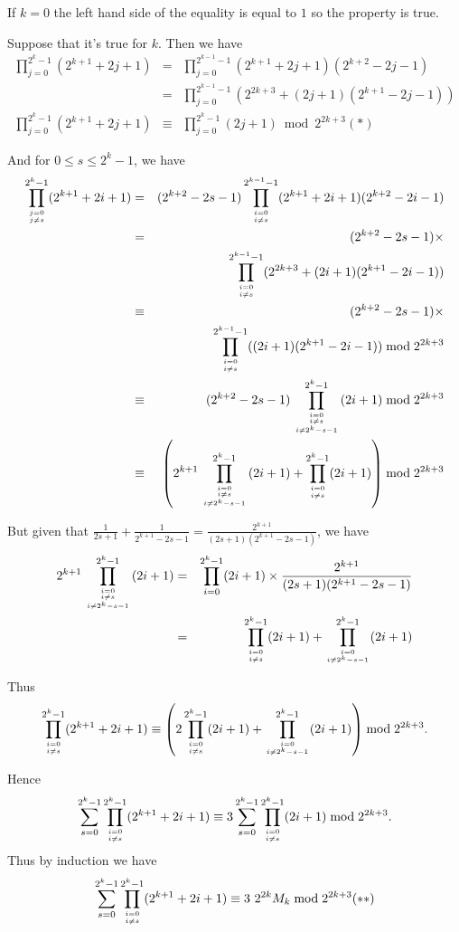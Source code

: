 \documentclass[a4paper,12pt]{article}
\begin{document}
If $k=0$ the left hand side of the equality is equal to $1$ so the
property is true.

Suppose that it's true for $k$.  Then we have
\begin{eqnarray*}
  \prod_{j=0}^{2^k-1}(2^{k+1} + 2j + 1) &=& \prod_{j=0}^{2^{k-1}-1}(2^{k+1}
  + 2j + 1)(2^{k+2} - 2j - 1) \\
  &=& \prod_{j=0}^{2^{k-1}-1}(2^{2k+3} + (2j+1)(2^{k+1}-2j-1)) \\
  \prod_{j=0}^{2^k-1}(2^{k+1} + 2j + 1) &\equiv&
  \prod_{j=0}^{2^k-1}(2j+1) \bmod 2^{2k+3} (*)
\end{eqnarray*}

And for $0 \le s \le 2^k -1$, we have
\begin{eqnarray*}
  \prod_{j=0 \atop j\not= s}^{2^k-1} (2^{k+1} + 2i + 1) &=& (2^{k+2} -
  2s -1) \prod_{i=0 \atop i \not= s}^{2^{k-1}-1}(2^{k+1} + 2i +
  1)(2^{k+2} - 2i - 1) \\
  &=& (2^{k+2} - 2s - 1) \times \\
  &&\prod_{i=0\atop i\not=s}^{2^{k-1}-1}(2^{2k+3}
  + (2i+1)(2^{k+1}-2i-1)) \\
  &\equiv& (2^{k+2} - 2s - 1) \times \\
  &&\prod_{i=0\atop i\not=s}^{2^{k-1}-1}((2i+1)(2^{k+1}-2i-1)) \bmod
  2^{2k+3}\\
  &\equiv& (2^{k+2} - 2s -1) \prod_{i=0\atop {i \not= s \atop i \not=
      2^k - s -1}}^{2^k-1} (2i+1) \bmod 2^{2k+3} \\
  &\equiv& \left(2^{k+1}\prod_{i=0\atop {i \not= s \atop i \not=
      2^k - s -1}}^{2^k-1} (2i+1) + \prod_{i=0\atop i\not=
    s}^{2^k-1}(2i+1)\right) \bmod 2^{2k+3}
\end{eqnarray*}

But given that $\frac{1}{2s+1} + \frac{1}{2^{k+1} - 2s - 1} =
\frac{2^{k+1}}{(2s+1)(2^{k+1}-2s-1)}$, we have
\begin{eqnarray*}
2^{k+1}\prod_{i=0\atop {i \not= s \atop i \not=
      2^k - s -1}}^{2^k-1} (2i+1) &=& \prod_{i=0}^{2^k-1}(2i+1)\times
\frac{2^{k+1}}{(2s+1)(2^{k+1}-2s-1)} \\
&=& \prod_{i=0\atop i\not= s}^{2^k-1}(2i+1) + \prod_{i=0\atop i\not= 2^k-s-1}^{2^k-1}(2i+1)
\end{eqnarray*}

Thus
\[  \prod_{i=0\atop i\not= s}^{2^k - 1}(2^{k+1} + 2i + 1) \equiv \left(2
\prod_{i=0\atop i\not= s}^{2^k-1}(2i+1) + \prod_{i=0\atop i\not= 2^k
  -s -1}^{2^k-1}(2i+1)\right) \bmod 2^{2k+3}.\]

Hence
\[\sum_{s=0}^{2^k-1}\prod_{i=0\atop i\not=s}^{2^k-1}(2^{k+1} + 2i +
1) \equiv 3 \sum_{s=0}^{2^k-1}\prod_{i=0\atop i\not=s}^{2^k-1}(2i+1)
\bmod 2^{2k+3}.\]
Thus by induction we have
\[\sum_{s=0}^{2^k-1}\prod_{i=0\atop i\not=s}^{2^k-1}(2^{k+1} + 2i +
1) \equiv 3\ 2^{2k}M_k \bmod 2^{2k+3} (**) \]
\end{document}
